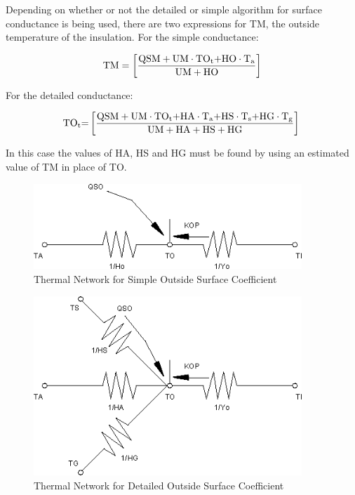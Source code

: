 Depending on whether or not the detailed or simple algorithm for surface conductance is being used, there are two expressions for TM, the outside temperature of the insulation. For the simple conductance:

\begin{equation}
{\rm{TM}} = \left[ {\frac{{{\rm{QSM + UM}}\cdot {\rm{T}}{{\rm{O}}_{\rm{t}}}{\rm{ + HO}}\cdot {{\rm{T}}_{\rm{a}}}}}{{{\rm{UM + HO}}}}} \right]
\end{equation}

For the detailed conductance:

\begin{equation}
{\rm{T}}{{\rm{O}}_{\rm{t}}}{\rm{ = }}\left[ {\frac{{{\rm{QSM}} + {\rm{UM}}\cdot {\rm{T}}{{\rm{O}}_{\rm{t}}}{\rm{ + HA}}\cdot {{\rm{T}}_{\rm{a}}}{\rm{ + HS}}\cdot {{\rm{T}}_{\rm{s}}}{\rm{ + HG}}\cdot {{\rm{T}}_{\rm{g}}}}}{{{\rm{UM + HA + HS + HG}}}}} \right]{\rm{  }}
\end{equation}

In this case the values of HA, HS and HG must be found by using an estimated value of TM in place of TO.

\begin{figure}[hbtp] %
\centering
\includegraphics[width=0.9\textwidth, height=0.9\textheight, keepaspectratio=true]{media/image420.png}
\caption{  Thermal Network for Simple Outside Surface Coefficient \protect \label{fig:thermal-network-for-simple-outside-surface}}
\end{figure}

\begin{figure}[hbtp] %
\centering
\includegraphics[width=0.9\textwidth, height=0.9\textheight, keepaspectratio=true]{media/image421.png}
\caption{  Thermal Network for Detailed Outside Surface Coefficient \protect \label{fig:thermal-network-for-detailed-outside-surface}}
\end{figure}

